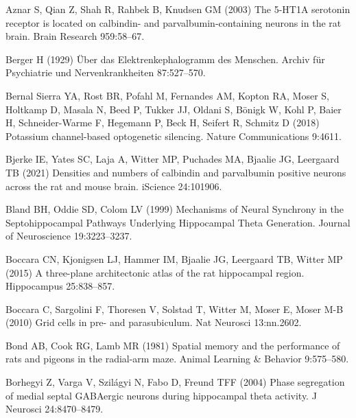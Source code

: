\documentclass[
  12pt,
  a4paper,
  openany]{book}
\newlength{\cslhangindent}
\newlength{\cslentryspacingunit} %
\newenvironment{CSLReferences}[2] %
 {%
  \setlength{\parindent}{0pt}
  \ifodd #1
  \let\oldpar\par
  \def\par{\hangindent=\cslhangindent\oldpar}
  \fi
  \setlength{\parskip}{#2\cslentryspacingunit}
 }%
 {}
\begin{document}
\begin{CSLReferences}{1}{0}
\leavevmode{}%
Aznar S, Qian Z, Shah R, Rahbek B, Knudsen GM (2003) The 5-{HT1A} serotonin receptor is located on calbindin- and parvalbumin-containing neurons in the rat brain. Brain Research 959:58--67.

\leavevmode{}%
Berger H (1929) {Ü}ber das {Elektrenkephalogramm} des {Menschen}. Archiv f{ü}r Psychiatrie und Nervenkrankheiten 87:527--570.

\leavevmode{}%
Bernal Sierra YA, Rost BR, Pofahl M, Fernandes AM, Kopton RA, Moser S, Holtkamp D, Masala N, Beed P, Tukker JJ, Oldani S, Bönigk W, Kohl P, Baier H, Schneider-Warme F, Hegemann P, Beck H, Seifert R, Schmitz D (2018) Potassium channel-based optogenetic silencing. Nature Communications 9:4611.

\leavevmode{}%
Bjerke IE, Yates SC, Laja A, Witter MP, Puchades MA, Bjaalie JG, Leergaard TB (2021) Densities and numbers of calbindin and parvalbumin positive neurons across the rat and mouse brain. iScience 24:101906.

\leavevmode{}%
Bland BH, Oddie SD, Colom LV (1999) Mechanisms of {Neural} {Synchrony} in the {Septohippocampal} {Pathways} {Underlying} {Hippocampal} {Theta} {Generation}. Journal of Neuroscience 19:3223--3237.

\leavevmode{}%
Boccara CN, Kjonigsen LJ, Hammer IM, Bjaalie JG, Leergaard TB, Witter MP (2015) A three-plane architectonic atlas of the rat hippocampal region. Hippocampus 25:838--857.

\leavevmode{}%
Boccara C, Sargolini F, Thoresen V, Solstad T, Witter M, Moser E, Moser M-B (2010) Grid cells in pre- and parasubiculum. Nat Neurosci 13:nn.2602.

\leavevmode{}%
Bond AB, Cook RG, Lamb MR (1981) Spatial memory and the performance of rats and pigeons in the radial-arm maze. Animal Learning \& Behavior 9:575--580.

\leavevmode{}%
Borhegyi Z, Varga V, Szilágyi N, Fabo D, Freund TFF (2004) Phase segregation of medial septal {GABAergic} neurons during hippocampal theta activity. J Neurosci 24:8470--8479.


\end{CSLReferences}
\end{document}
